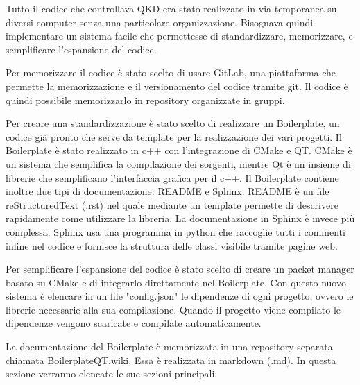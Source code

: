 Tutto il codice che controllava QKD era stato realizzato in via temporanea su diversi computer senza una particolare organizzazione. Bisognava quindi implementare un sistema facile che permettesse di standardizzare, memorizzare, e semplificare l'espansione del codice.

Per memorizzare il codice è stato scelto di usare GitLab, una piattaforma che permette la memorizzazione e il versionamento del codice tramite git. Il codice è quindi possibile memorizzarlo in repository organizzate in gruppi.

Per creare una standardizzazione è stato scelto di realizzare un Boilerplate, un codice già pronto che serve da template per la realizzazione dei vari progetti. Il Boilerplate è stato realizzato in c++ con l'integrazione di CMake e QT. CMake è un sistema che semplifica la compilazione dei sorgenti, mentre Qt è un insieme di librerie che semplificano l'interfaccia grafica per il c++. Il Boilerplate contiene inoltre due tipi di documentazione: README e Sphinx. README è un file reStructuredText (.rst) nel quale mediante un template permette di descrivere rapidamente come utilizzare la libreria. La documentazione in Sphinx è invece più complessa. Sphinx usa una programma in python che raccoglie tutti i commenti inline nel codice e fornisce la struttura delle classi visibile tramite pagine web.

Per semplificare l'espansione del codice è stato scelto di creare un packet manager basato su CMake e di integrarlo direttamente nel Boilerplate. Con questo nuovo sistema è elencare in un file "config.json" le dipendenze di ogni progetto, ovvero le librerie necessarie alla sua compilazione. Quando il progetto viene compilato le dipendenze vengono scaricate e compilate automaticamente.

La documentazione del Boilerplate è memorizzata in una repository separata chiamata BoilerplateQT.wiki. Essa è realizzata in markdown (.md). In questa sezione verranno elencate le sue sezioni principali.



